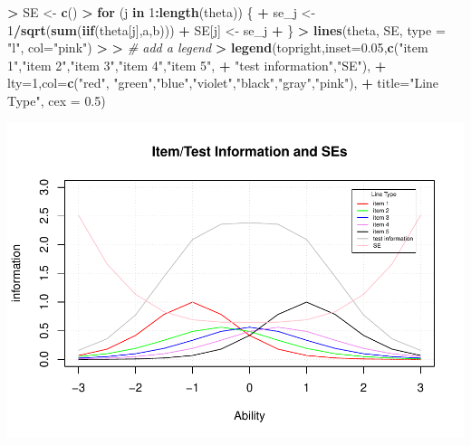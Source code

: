 \documentclass[
]{article}
\newenvironment{Shaded}{\begin{snugshade}}{\end{snugshade}}
\newcommand{\AttributeTok}[1]{\textcolor[rgb]{0.13,0.29,0.53}{#1}}
\newcommand{\CommentTok}[1]{\textcolor[rgb]{0.56,0.35,0.01}{\textit{#1}}}
\newcommand{\ControlFlowTok}[1]{\textcolor[rgb]{0.13,0.29,0.53}{\textbf{#1}}}
\newcommand{\DecValTok}[1]{\textcolor[rgb]{0.00,0.00,0.81}{#1}}
\newcommand{\ErrorTok}[1]{\textcolor[rgb]{0.64,0.00,0.00}{\textbf{#1}}}
\newcommand{\FloatTok}[1]{\textcolor[rgb]{0.00,0.00,0.81}{#1}}
\newcommand{\FunctionTok}[1]{\textcolor[rgb]{0.13,0.29,0.53}{\textbf{#1}}}
\newcommand{\NormalTok}[1]{#1}
\newcommand{\OtherTok}[1]{\textcolor[rgb]{0.56,0.35,0.01}{#1}}
\newcommand{\SpecialCharTok}[1]{\textcolor[rgb]{0.81,0.36,0.00}{\textbf{#1}}}
\newcommand{\StringTok}[1]{\textcolor[rgb]{0.31,0.60,0.02}{#1}}
\begin{document}
\begin{Shaded}
\begin{Highlighting}[]
\ErrorTok{\textgreater{}}\NormalTok{ SE }\OtherTok{\textless{}{-}} \FunctionTok{c}\NormalTok{()}
\SpecialCharTok{\textgreater{}} \ControlFlowTok{for}\NormalTok{ (j }\ControlFlowTok{in} \DecValTok{1}\SpecialCharTok{:}\FunctionTok{length}\NormalTok{(theta)) \{}
\SpecialCharTok{+}\NormalTok{   se\_j }\OtherTok{\textless{}{-}} \DecValTok{1}\SpecialCharTok{/}\FunctionTok{sqrt}\NormalTok{(}\FunctionTok{sum}\NormalTok{(}\FunctionTok{iif}\NormalTok{(theta[j],a,b)))}
\SpecialCharTok{+}\NormalTok{   SE[j] }\OtherTok{\textless{}{-}}\NormalTok{ se\_j}
\SpecialCharTok{+}\NormalTok{ \}}
\SpecialCharTok{\textgreater{}} \FunctionTok{lines}\NormalTok{(theta, SE, }\AttributeTok{type =} \StringTok{"l"}\NormalTok{, }\AttributeTok{col=}\StringTok{"pink"}\NormalTok{)}
\SpecialCharTok{\textgreater{}} 
\ErrorTok{\textgreater{}} \CommentTok{\# add a legend}
\ErrorTok{\textgreater{}} \FunctionTok{legend}\NormalTok{(}\StringTok{\textquotesingle{}topright\textquotesingle{}}\NormalTok{,}\AttributeTok{inset=}\FloatTok{0.05}\NormalTok{,}\FunctionTok{c}\NormalTok{(}\StringTok{"item 1"}\NormalTok{,}\StringTok{"item 2"}\NormalTok{,}\StringTok{"item 3"}\NormalTok{,}\StringTok{"item 4"}\NormalTok{,}\StringTok{"item 5"}\NormalTok{,}
\SpecialCharTok{+}                               \StringTok{"test information"}\NormalTok{,}\StringTok{"SE"}\NormalTok{),}
\SpecialCharTok{+}        \AttributeTok{lty=}\DecValTok{1}\NormalTok{,}\AttributeTok{col=}\FunctionTok{c}\NormalTok{(}\StringTok{"red"}\NormalTok{, }\StringTok{"green"}\NormalTok{,}\StringTok{"blue"}\NormalTok{,}\StringTok{"violet"}\NormalTok{,}\StringTok{"black"}\NormalTok{,}\StringTok{"gray"}\NormalTok{,}\StringTok{"pink"}\NormalTok{),}
\SpecialCharTok{+}        \AttributeTok{title=}\StringTok{"Line Type"}\NormalTok{, }\AttributeTok{cex =} \FloatTok{0.5}\NormalTok{)}
\end{Highlighting}
\end{Shaded}

\includegraphics{Assignment_3_files/figure-latex/unnamed-chunk-1-1.pdf}
\end{document}
